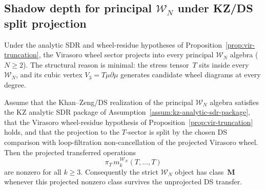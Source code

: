 \subsection{Shadow depth for principal
\texorpdfstring{$\mathcal{W}_N$}{W\_N} under KZ/DS split projection}
\label{subsec:wn-class-M}

Under the analytic SDR and wheel-residue hypotheses of
Proposition~\ref{prop:vir-truncation}, the Virasoro wheel sector
projects into every principal $\mathcal{W}_N$ algebra ($N \ge 2$).
The structural reason is minimal: the stress tensor~$T$ sits inside
every $\mathcal{W}_N$, and its cubic vertex
$V_3 = T\mu\partial\mu$ generates candidate wheel diagrams at every
degree.

\begin{theorem}
\label{thm:wn-class-M-stable}
%
%
Assume that the Khan--Zeng/DS realization of the principal
$\mathcal{W}_N$ algebra satisfies the KZ analytic SDR package of
Assumption~\textup{\ref{assum:kz-analytic-sdr-package}}, that the
Virasoro wheel-residue hypothesis of
Proposition~\textup{\ref{prop:vir-truncation}} holds, and that the
projection to the $T$-sector is split by the chosen DS comparison with
loop-filtration non-cancellation of the projected Virasoro wheel.
Then the projected transferred operations
\[
 \pi_T\,m_k^{\mathcal W_N}(T,\ldots,T)
\]
are nonzero for all $k\ge 3$. Consequently the strict
$\mathcal W_N$ object has class~$\mathbf M$ whenever this projected
nonzero class survives the unprojected DS transfer.
\end{theorem}


